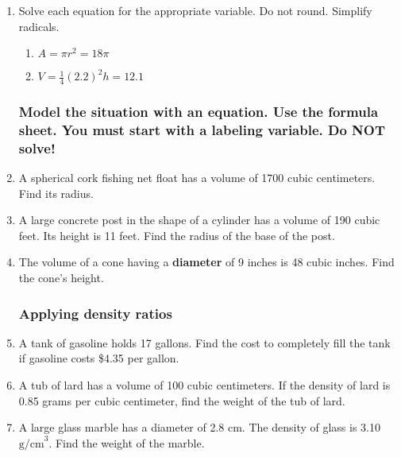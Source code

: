 \documentclass[12pt, twoside]{article}
\begin{document}
\begin{enumerate}
  \item Solve each equation for the appropriate variable. Do not round. Simplify radicals.
  \begin{multicols}{2}
  \begin{enumerate}[itemsep=2cm]
    \item $A=\pi r^2=18\pi$
    \item $V=\frac{1}{4}(2.2)^2h=12.1$
  \end{enumerate}
  \end{multicols}\vspace{5cm}

  \subsubsection*{Model the situation with an equation. Use the formula sheet. You must start with a labeling variable. \hfill Do NOT solve!}

  \item A spherical cork fishing net float has a volume of 1700 cubic centimeters. Find its radius. \vspace{2cm}
  
  \item A large concrete post in the shape of a cylinder has a volume of 190 cubic feet. Its height is 11 feet. Find the radius of the base of the post. \vspace{2cm}

  \item The volume of a cone having a \textbf{diameter} of 9 inches is 48 cubic inches. Find the cone's height. \vspace{2cm}

  \newpage
  \subsubsection*{Applying density ratios}
  \item A tank of gasoline holds 17 gallons. Find the cost to completely fill the tank if gasoline costs \$4.35 per gallon. \vspace{3cm}
  \item A tub of lard has a volume of 100 cubic centimeters. If the density of lard is 0.85 grams per cubic centimeter, find the weight of the tub of lard. \vspace{3cm}
  \item A large glass marble has a diameter of 2.8 cm. The density of glass is 3.10 $\mathrm{g/cm}^3$. Find the weight of the marble. \vspace{3cm}


\end{enumerate}
\end{document}
